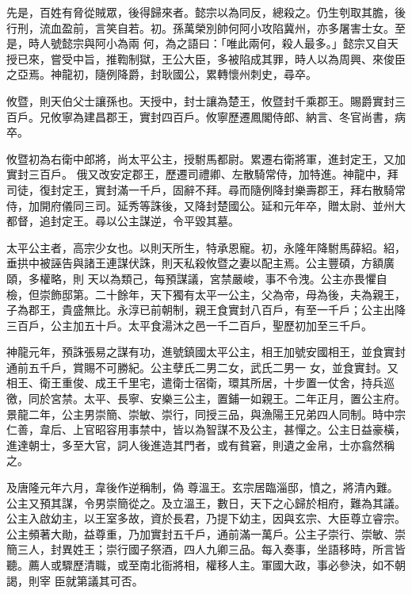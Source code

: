 \begin{pinyinscope}
 先是，百姓有脅從賊眾，後得歸來者。懿宗以為同反，總殺之。仍生刳取其膽，後行刑，流血盈前，言笑自若。初。孫萬榮別帥何阿小攻陷冀州，亦多屠害士女。至是，時人號懿宗與阿小為兩
 何，為之語曰：「唯此兩何，殺人最多。」懿宗又自天授已來，嘗受中旨，推鞫制獄，王公大臣，多被陷成其罪，時人以為周興、來俊臣之亞焉。神龍初，隨例降爵，封耿國公，累轉懷州刺史，尋卒。



 攸暨，則天伯父士讓孫也。天授中，封士讓為楚王，攸暨封千乘郡王。賜爵實封三百戶。兄攸寧為建昌郡王，實封四百戶。攸寧歷遷鳳閣侍郎、納言、冬官尚書，病卒。



 攸暨初為右衛中郎將，尚太平公主，授駙馬都尉。累遷右衛將軍，進封定王，又加實封三百戶。
 俄又改安定郡王，歷遷司禮卿、左散騎常侍，加特進。神龍中，拜司徒，復封定王，實封滿一千戶，固辭不拜。尋而隨例降封樂壽郡王，拜右散騎常侍，加開府儀同三司。延秀等誅後，又降封楚國公。延和元年卒，贈太尉、並州大都督，追封定王。尋以公主謀逆，令平毀其墓。



 太平公主者，高宗少女也。以則天所生，特承恩寵。初，永隆年降駙馬薛紹。紹，垂拱中被誣告與諸王連謀伏誅，則天私殺攸暨之妻以配主焉。公主豐碩，方額廣頤，多權略，則
 天以為類己，每預謀議，宮禁嚴峻，事不令洩。公主亦畏懼自檢，但崇飾邸第。二十餘年，天下獨有太平一公主，父為帝，母為後，夫為親王，子為郡王，貴盛無比。永淳已前朝制，親王食實封八百戶，有至一千戶；公主出降三百戶，公主加五十戶。太平食湯沐之邑一千二百戶，聖歷初加至三千戶。



 神龍元年，預誅張易之謀有功，進號鎮國太平公主，相王加號安國相王，並食實封通前五千戶，賞賜不可勝紀。公主孽氏二男二女，武氏二男一
 女，並食實封。又相王、衛王重俊、成王千里宅，遣衛士宿衛，環其所居，十步置一仗舍，持兵巡徼，同於宮禁。太平、長寧、安樂三公主，置鋪一如親王。二年正月，置公主府。景龍二年，公主男崇簡、崇敏、崇行，同授三品，與漁陽王兄弟四人同制。時中宗仁善，韋后、上官昭容用事禁中，皆以為智謀不及公主，甚憚之。公主日益豪橫，進達朝士，多至大官，詞人後進造其門者，或有貧窘，則遺之金帛，士亦翕然稱之。



 及唐隆元年六月，韋後作逆稱制，偽
 尊溫王。玄宗居臨淄邸，憤之，將清內難。公主又預其謀，令男崇簡從之。及立溫王，數日，天下之心歸於相府，難為其議。公主入啟幼主，以王室多故，資於長君，乃提下幼主，因與玄宗、大臣尊立睿宗。公主頻著大勛，益尊重，乃加實封五千戶，通前滿一萬戶。公主子崇行、崇敏、崇簡三人，封異姓王；崇行國子祭酒，四人九卿三品。每入奏事，坐語移時，所言皆聽。薦人或驟歷清職，或至南北衙將相，權移人主。軍國大政，事必參決，如不朝謁，則宰
 臣就第議其可否。




\end{pinyinscope}

